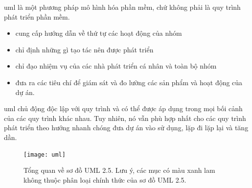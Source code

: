 {{\acrshort{uml} là một phương pháp mô hình hóa phần mềm, chứ không phải là quy trình phát triển phần mềm.
\begin{itemize}
\item cung cấp hướng dẫn về thứ tự các hoạt động của nhóm
\item chỉ định những gì tạo tác nên được phát triển
\item chỉ đạo nhiệm vụ của các nhà phát triển cá nhân và toàn bộ nhóm
\item đưa ra các tiêu chí để giám sát và đo lường các sản phẩm và hoạt động của dự án.
\end{itemize}
\acrshort{uml} chủ động độc lập với quy trình và có thể được áp dụng trong mọi bối cảnh của các quy trình khác nhau. Tuy nhiên, nó vẫn phù hợp nhất cho các quy trình phát triển theo hướng nhanh chóng đưa dự án vào sử dụng, lặp đi lặp lại và tăng dần.

\begin{figure}[h!]
	\caption{Tổng quan về sơ đồ UML 2.5. Lưu ý, các mục có màu xanh lam không thuộc phân loại chính thức của sơ đồ UML 2.5. \cite{web:uml}}
	\centering
	\texttt{[image: uml]}
\end{figure}

}}
